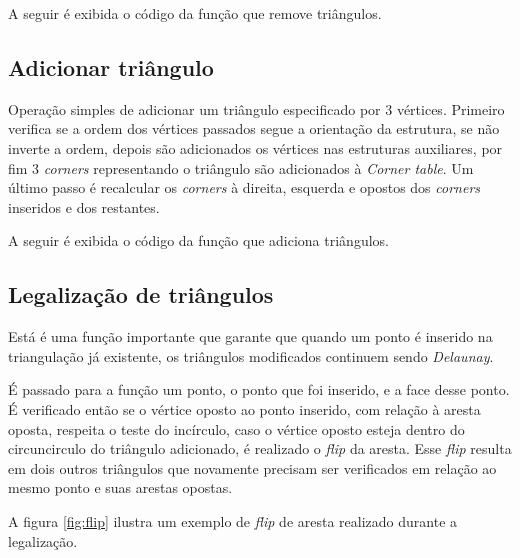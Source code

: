 \documentclass[a4paper]{article}
\begin{document}
A seguir é exibida o código da função que remove triângulos.




\subsection{Adicionar triângulo}

Operação simples de adicionar um triângulo especificado por 3 vértices. Primeiro verifica se a ordem dos vértices passados segue a orientação da estrutura, se não inverte a ordem, depois são adicionados os vértices nas estruturas auxiliares, por fim 3 \textit{corners} representando o triângulo são adicionados à \textit{Corner table}. Um último passo é recalcular os \textit{corners} à direita, esquerda e opostos dos \textit{corners} inseridos e dos restantes.


A seguir é exibida o código da função que adiciona triângulos.



\subsection{Legalização de triângulos}

Está é uma função importante que garante que quando um ponto é inserido na triangulação já existente, os triângulos modificados continuem sendo \textit{Delaunay}.

É passado para a função um ponto, o ponto que foi inserido, e a face desse ponto. É verificado então se o vértice oposto ao ponto inserido, com relação à aresta oposta, respeita o teste do incírculo, caso o vértice oposto esteja dentro do circuncirculo do triângulo adicionado, é realizado o \textit{flip} da aresta. Esse \textit{flip} resulta em dois outros triângulos que novamente precisam ser verificados em relação ao mesmo ponto e suas arestas opostas.


A figura \ref{fig:flip} ilustra um exemplo de \textit{flip} de aresta realizado durante a legalização.
\end{document}
